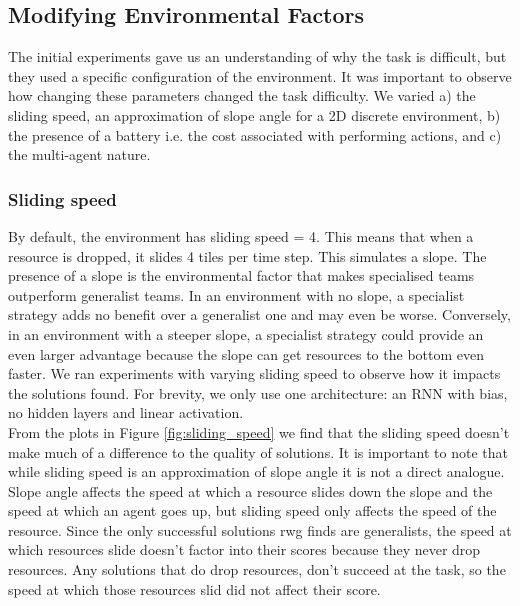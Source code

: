 \documentclass[12pt]{article}
\begin{document}
	
						
\subsection{Modifying Environmental Factors}

The initial experiments gave us an understanding of why the task is difficult, but they used a specific configuration of the environment. It was important to observe how changing these parameters changed the task difficulty. We varied a) the sliding speed, an approximation of slope angle for a 2D discrete environment, b) the presence of a battery i.e. the cost associated with performing actions, and c) the multi-agent nature.

\subsubsection{Sliding speed}

By default, the environment has sliding speed = 4. This means that when a resource is dropped, it slides 4 tiles per time step. This simulates a slope. The presence of a slope is the environmental factor that makes specialised teams outperform generalist teams. In an environment with no slope, a specialist strategy adds no benefit over a generalist one and may even be worse. Conversely, in an environment with a steeper slope, a specialist strategy could provide an even larger advantage because the slope can get resources to the bottom even faster. We ran experiments with varying sliding speed to observe how it impacts the solutions found. For brevity, we only use one architecture: an RNN with bias, no hidden layers and linear activation.\\

From the plots in Figure \ref{fig:sliding_speed} we find that the sliding speed doesn't make much of a difference to the quality of solutions. It is important to note that while sliding speed is an approximation of slope angle it is not a direct analogue. Slope angle affects the speed at which a resource slides down the slope and the speed at which an agent goes up, but sliding speed only affects the speed of the resource. Since the only successful solutions rwg finds are generalists, the speed at which resources slide doesn't factor into their scores because they never drop resources. Any solutions that do drop resources, don't succeed at the task, so the speed at which those resources slid did not affect their score.\\
\end{document}
